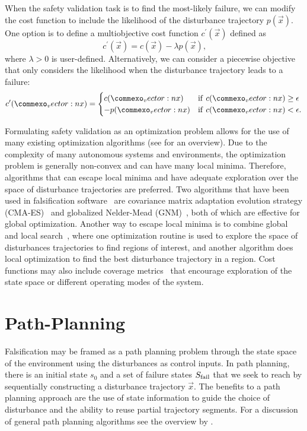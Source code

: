 When the safety validation task is to find the most-likely failure, we can modify the cost function to include the likelihood of the disturbance trajectory $p(\vec{x})$. One option is to define a multiobjective cost function $c^\prime(\vec{x})$ defined as
\begin{equation}
    c^\prime(\vec{x}) = c(\vec{x}) - \lambda p(\vec{x}) \text{,}
\end{equation}
where $\lambda > 0$ is user-defined. Alternatively, we can consider a piecewise objective that only considers the likelihood when the disturbance trajectory leads to a failure:
\begin{equation}
    c^\prime(\vec{x}) = \begin{cases}
        c(\vec{x})  & {\rm if} \ c(\vec{x}) \geq \epsilon \\
        -p(\vec{x}) & {\rm if} \ c(\vec{x}) < \epsilon \text{.}
    \end{cases}
\end{equation}

Formulating safety validation as an optimization problem allows for the use of many existing optimization algorithms (see \textcite{kochenderfer2019algorithms} for an overview).  Due to the complexity of many autonomous systems and environments, the optimization problem is generally non-convex and can have many local minima. Therefore, algorithms that can escape local minima and have adequate exploration over the space of disturbance trajectories are preferred. Two algorithms that have been used in falsification software~\cite{annapureddy2011staliro,donze2010breach} are covariance matrix adaptation evolution strategy (CMA-ES)~\cite{hansen1996adapting} and globalized Nelder-Mead (GNM)~\cite{luersen2004globalized}, both of which are effective for global optimization. Another way to escape local minima is to combine global and local search~\cite{deshmukh2015stochastic,adimoolam2017classification, yaghoubi2019gray,Mathesen2019falsification}, where one optimization routine is used to explore the space of disturbances trajectories to find regions of interest, and another algorithm does local optimization to find the best disturbance trajectory in a region. Cost functions may also include coverage metrics~\cite{esposito2004adaptive,Nahhal2007Test,dokhanchi2015requirements} that encourage exploration of the state space or different operating modes of the system. 

\section{Path-Planning}
Falsification may be framed as a path planning problem through the state space of the environment using the disturbances as control inputs. In path planning, there is an initial state $s_0$ and a set of failure states $S_{\rm fail}$ that we seek to reach by sequentially constructing a disturbance trajectory $\vec{x}$. The benefits to a path planning approach are the use of state information to guide the choice of disturbance and the ability to reuse partial trajectory segments. For a discussion of general path planning algorithms see the overview by \textcite{lavalle2006planning}.

